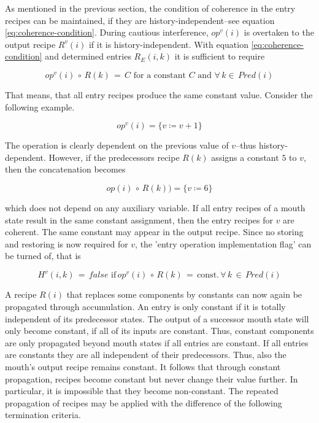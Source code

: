 \documentclass[12pt,a4paper]{scrartcl}
\begin{document}
As mentioned in the previous section, the condition of coherence in the entry
recipes can be maintained, if they are history-independent--see equation
\ref{eq:coherence-condition}.  During cautious interference, $op^v(i)$ is
overtaken to the output recipe $R^v(i)$ if it is history-independent.  With equation
\ref{eq:coherence-condition} and determined entries $R_E(i,k)$ it is
sufficient to require 

\begin{equation} \label{eq:coherence-condition-2}
    op^v(i)\,\circ\,R(k)\,=\,C\,\,\mbox{for a constant $C$ and } \forall\,k\in\,Pred(i)
\end{equation}

That means, that all entry recipes produce the same constant value. Consider
the following example.

\begin{equation}
    op^v(i) = \{ v \coloneqq  v + 1 \}
\end{equation}

The operation is clearly dependent on the previous value of $v$--thus 
history-dependent. However, if the predecessors recipe $R(k)$ assigns a constant $5$ to
$v$, then the concatenation becomes

\begin{equation}
    op(i)\,\circ\,R(k)) = \{ v \coloneqq  6 \}
\end{equation}

which does not depend on any auxiliary variable. If all entry recipes of a
mouth state result in the same constant assignment, then the entry recipes for
$v$ are coherent.  The same constant may appear in the output recipe. Since
no storing and restoring is now required for $v$, the 'entry operation
implementation flag' can be turned of, that is

\begin{equation}
    H^v(i,k)\,=\,false\,\,\mbox{if}\,op^v(i)\,\circ\,R(k)\,=\,\mbox{const.}\,\forall\,k\,\in\,Pred(i)
\end{equation}

A recipe $R(i)$ that replaces some components by constants can now again be
propagated through accumulation. An entry is only constant if it is totally
independent of its predecessor states. The output of a successor mouth state
will only become constant, if all of its inputs are constant. Thus, constant
components are only propagated beyond mouth states if all entries are constant.
If all entries are constants they are all independent of their predecessors.
Thus, also the mouth's output recipe remains constant. It follows that through
constant propagation, recipes become constant but never change their value
further.  In particular, it is impossible that they become non-constant.
The repeated propagation of recipes may be applied with the difference of the
following termination criteria.
\end{document}
